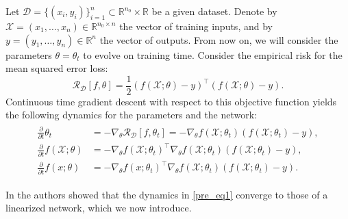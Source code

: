 \documentclass{article}
\theoremstyle{definition}
\newtheorem{defn}[thm]{Definition}
\theoremstyle{remark}
\numberwithin{equation}{section}
\newcommand{\X}{\mathcal{X}}
\newcommand{\R}{\mathbb{R}}
\newcommand{\kttest}{k_{xx}}
\newcommand{\ktest}{k_{x\X}}
\newcommand{\ktrain}{k_{\X\X}}
\newcommand{\lin}{{\textup{lin}}}
\begin{document}
Let $\mathcal D = \{(x_i,y_i)\}_{i=1}^n \subset \R^{n_0} \times \R$ be a given dataset.
Denote by $\X = (x_1, \ldots, x_n) \in \R^{n_0 \times n}$ the vector of training inputs, and by $y = (y_1, \ldots, y_{n}) \in \R^{n}$ the vector of outputs.
From now on, we will consider the parameters $\theta = \theta_t$ to evolve on training time.
Consider the empirical risk for the mean squared error loss: 
\[\mathcal R_\mathcal{D}[f,\theta] = \frac{1}{2}(f(\X;\theta)-y)^\top(f(\X;\theta)-y).\]
Continuous time gradient descent with respect to this objective function yields the following dynamics for the parameters and the network:
\begin{align}
    \begin{split}
        \label{pre_eq1}
    \frac{\partial}{\partial t} \theta_t &= - \nabla_{\theta} \mathcal R_\mathcal{D}[f,\theta_t] = - \nabla_{\theta}f(\X;\theta_t) (f(\X;\theta_t) - y),\\
    \frac{\partial}{\partial t} f(\X;\theta) &= -\nabla_{\theta}f(\X;\theta_t)^\top\nabla_{\theta}f(\X;\theta_t) (f(\X;\theta_t) - y),\\
    \frac{\partial}{\partial t} f(x;\theta) &= -\nabla_{\theta}f(x;\theta_t)^\top\nabla_{\theta}f(\X;\theta_t) (f(\X;\theta_t) - y).
    \end{split}
\end{align}

In \cite{Lee2020} the authors showed that the dynamics in \eqref{pre_eq1} converge to those of a linearized network, which we now introduce.

\end{document}

